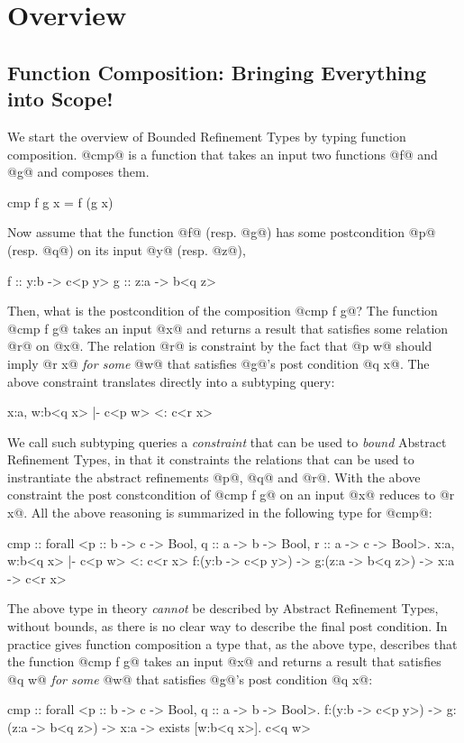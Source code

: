 \section{Overview}\label{sec:overview}
\begin{comment}
<->append 
- complete cmp complete
<-> composition cmp A
- filter cmp Kaki
- state cmp Nik
\end{comment}

\subsection{Function Composition: Bringing Everything into Scope!}

We start the overview of Bounded Refinement Types by typing function composition.
%
@cmp@ is a function that takes an input two functions @f@ and @g@ and composes them.
%
\begin{code}
cmp f g x = f (g x)
\end{code}
%
Now assume that the function @f@ (resp. @g@) has some postcondition @p@ (resp. @q@) on its input @y@ (resp. @z@), \ie
%
\begin{code}
  f :: y:b -> c<p y> 
  g :: z:a -> b<q z>
\end{code}
%
Then, what is the postcondition of the composition @cmp f g@?
%
The function @cmp f g@ takes an input @x@ and returns a result that satisfies some 
relation @r@ on @x@. 
%
The relation @r@ is constraint by the fact that @p w@ should imply @r x@
\textit{for some} @w@ that satisfies @g@'s post condition @q x@.
%
The above constraint translates directly into a subtyping query:
\begin{code}
  {x:a, w:b<q x> |- c<p w> <: c<r x>}
\end{code}
We call such subtyping queries a \textit{constraint} that can be used to 
\textit{bound} Abstract Refinement Types, in that it constraints the relations
that can be used to instrantiate the abstract refinements @p@, @q@ and @r@.
%
With the above constraint the post constcondition of @cmp f g@
on an input @x@ reduces to @r x@.
%
All the above reasoning is summarized in the following type for @cmp@:
\begin{code}
cmp :: forall <p :: b -> c -> Bool, q :: a -> b -> Bool, r :: a -> c -> Bool>. 
       {x:a, w:b<q x> |- c<p w> <: c<r x>}
       f:(y:b -> c<p y>)
    -> g:(z:a -> b<q z>)
    ->   x:a -> c<r x>
\end{code}
%

The above type in theory \textit{cannot} be described by Abstract Refinement Types, 
without bounds, as there is no clear way to describe the final post condition. 
%
In practice \toolname gives function composition a type that, as the above type,
describes that 
the function @cmp f g@ takes an input @x@ and returns a result that satisfies 
@q w@
\textit{for some} @w@ that satisfies @g@'s post condition @q x@:
%
\begin{code}
cmp :: forall <p :: b -> c -> Bool, q :: a -> b -> Bool>. 
       f:(y:b -> c<p y>)
    -> g:(z:a -> b<q z>)
    ->  x:a -> exists [w:b<q x>]. c<q w>
\end{code}

